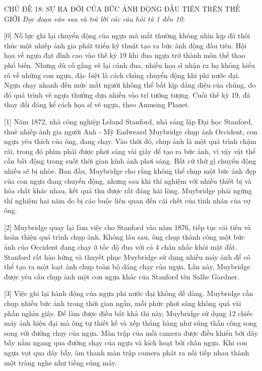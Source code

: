\documentclass[12pt,a4paper,twoside]{article}
\newenvironment{readingpassage}[1][]{%
    \begin{tcolorbox}[enhanced, colback=grayLight, colframe=secondaryBlue,
        coltitle=textDark, fonttitle=\bfseries, title={#1},
        rounded corners, arc=3mm, boxrule=1pt,
        left=15pt, right=15pt, top=10pt, bottom=10pt,
        breakable, before skip=10pt, after skip=10pt, drop fuzzy shadow]
    \setstretch{1.3}
}{\end{tcolorbox}}
\begin{document}
\newpage
\label{a_cd18}
\begin{topicbox}{\large CHỦ ĐỀ 18: SỰ RA ĐỜI CỦA BỨC ẢNH ĐỘNG ĐẦU TIÊN TRÊN THẾ GIỚI}
\vspace{8pt}
\textit{Đọc đoạn văn sau và trả lời các câu hỏi từ 1 đến 10.}
\vspace{6pt}
\end{topicbox}
\vspace{5pt}
\begin{readingpassage}[]
[0] Nỗ lực ghi lại chuyển động của ngựa mà mắt thường không nhìn kịp đã thôi thúc một nhiếp ảnh gia phát triển kỹ thuật tạo ra bức ảnh động đầu tiên. Hội họa về ngựa đạt đỉnh cao vào thế kỷ 19 khi đua ngựa trở thành môn thể thao phổ biến. Nhưng dù cố gắng vẽ lại cảnh đua, nhiều họa sĩ nhận ra họ không hiểu rõ về những con ngựa, đặc biệt là cách chúng chuyển động khi phi nước đại. Ngựa chạy nhanh đến mức mắt người không thể bắt kịp dáng điệu của chúng, do đó quá trình vẽ ngựa thường dựa nhiều vào trí tưởng tượng. Cuối thế kỷ 19, đã thay đổi đáng kể cách họa sĩ vẽ ngựa, theo Amusing Planet.

[1] Năm 1872, nhà công nghiệp Leland Stanford, nhà sáng lập Đại học Stanford, thuê nhiếp ảnh gia người Anh - Mỹ Eadweard Muybridge chụp ảnh Occident, con ngựa yêu thích của ông, đang chạy. Vào thời đó, chụp ảnh là một quá trình chậm rãi, trong đó phim phải được phơi sáng vài giây để tạo ra bức ảnh, vì vậy vật thể cần bất động trong suốt thời gian kính ảnh phơi sáng. Bất cứ thứ gì chuyển động nhiều sẽ bị nhòe. Ban đầu, Muybridge cho rằng không thể chụp một bức ảnh đẹp của con ngựa đang chuyển động, nhưng sau khi thí nghiệm với nhiều thiết bị và hóa chất khác nhau, kết quả thu được rất đáng hài lòng. Muybridge phải ngừng thí nghiệm hai năm do bị cáo buộc liên quan đến cái chết của tình nhân của vợ ông.

[2] Muybridge quay lại làm việc cho Stanford vào năm 1876, tiếp tục cải tiến và hoàn thiện quá trình chụp ảnh. Không lâu sau, ông chụp thành công một bức ảnh của Occident đang chạy ở tốc độ đua với cả 4 chân nhấc khỏi mặt đất. Stanford rất hào hứng và thuyết phục Muybridge sử dụng nhiều máy ảnh để có thể tạo ra một loạt ảnh chụp toàn bộ dáng chạy của ngựa. Lần này, Muybridge được yêu cầu chụp ảnh một con ngựa khác của Stanford tên Sallie Gardner.

[3] Việc ghi lại hành động của ngựa phi nước đại không dễ dàng. Muybridge cần chụp nhiều bức ảnh trong thời gian ngắn, mỗi phức phơi sáng không quá vài phần nghìn giây. Để làm được điều bất khả thi này, Muybridge sử dụng 12 chiếc máy ảnh hiện đại mà ông tự thiết kế và xếp thẳng hàng như súng thần công song song với đường chạy của ngựa. Màn trập của mỗi camera được điều khiển bởi dây bẫy nằm ngang qua đường chạy của ngựa và kích hoạt bởi chân ngựa. Khi con ngựa vọt qua dây bẫy, âm thanh màn trập camera phát ra nối tiếp nhau thành một tràng nghe như tiếng súng máy.


\end{readingpassage}
\end{document}
